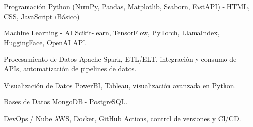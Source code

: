 


\begin{cvskills}


\cvskill
{Programación} %
{Python (NumPy, Pandas, Matplotlib, Seaborn, FastAPI) - HTML, CSS, JavaScript (Básico)} %


\cvskill
{Machine Learning - AI} %
{Scikit-learn, TensorFlow, PyTorch, LlamaIndex, HuggingFace, OpenAI API.} %


\cvskill
{Procesamiento de Datos} %
{Apache Spark, ETL/ELT, integración y consumo de APIs, automatización de pipelines de datos.} %


\cvskill
{Visualización de Datos} %
{PowerBI, Tableau, visualización avanzada en Python.} %


\cvskill
{Bases de Datos} %
{MongoDB - PostgreSQL.} %


\cvskill
{DevOps / Nube} %
{AWS, Docker, GitHub Actions, control de versiones y CI/CD.} %




\end{cvskills}